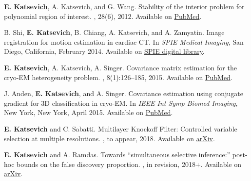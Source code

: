 \documentclass[letterpaper]{article}
\begin{document}
\begin{thebibliography}{10}
\vspace{-0.7truecm}


{\bf E. Katsevich}, A. Katsevich, and G. Wang.
\newblock Stability of the interior problem for polynomial region of interest.
, 28(6), 2012. Available on \href{https://www.ncbi.nlm.nih.gov/pubmed/24058227}{PubMed}.

B. Shi, {\bf E. Katsevich}, B. Chiang, A. Katsevich, and A. Zamyatin.
\newblock Image registration for motion estimation in cardiac CT.
\newblock In {\em SPIE Medical Imaging}, San Diego, California, February 2014. Available on \href{https://www.spiedigitallibrary.org/conference-proceedings-of-spie/9033/90332E/Image-registration-for-motion-estimation-in-cardiac-CT/10.1117/12.2043559.full?SSO=1}{SPIE digital library}.

{\bf E. Katsevich}, A. Katsevich, A. Singer. 
\newblock Covariance matrix estimation for the cryo-EM heterogeneity problem.
, 8(1):126--185, 2015. Available on \href{https://www.ncbi.nlm.nih.gov/pmc/articles/PMC4331039/}{PubMed}.

J. Anden, {\bf E. Katsevich}, and A. Singer.
\newblock Covariance estimation using conjugate gradient for 3D classification in cryo-EM.
\newblock In {\em IEEE Int Symp Biomed Imaging}, New York, New York, April 2015. Available on \href{https://www.ncbi.nlm.nih.gov/pmc/articles/PMC4679407/}{PubMed}.

{\bf E. Katsevich} and C. Sabatti. 
\newblock Multilayer Knockoff Filter: Controlled variable selection at multiple resolutions.
, to appear, 2018. Available on \href{https://arxiv.org/abs/1706.09375}{arXiv}.

{\bf E. Katsevich} and A. Ramdas. 
\newblock Towards ``simultaneous selective inference:'' post-hoc bounds on the false discovery proportion.
, in revision, 2018+. Available on \href{https://arxiv.org/abs/1803.06790}{arXiv}.


\end{thebibliography}
\end{document}
